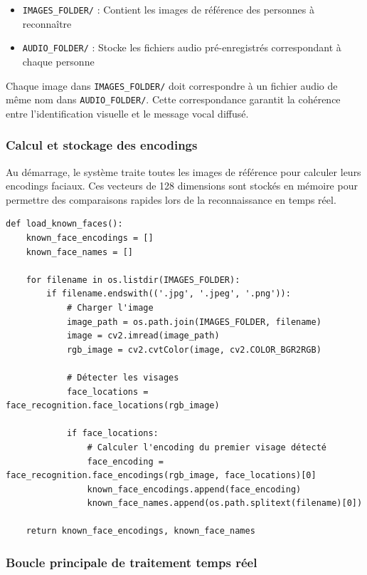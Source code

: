 \documentclass[12pt,a4paper]{article}
\begin{document}
\begin{itemize}
\item \texttt{IMAGES\_FOLDER/} : Contient les images de référence des personnes à reconnaître
\item \texttt{AUDIO\_FOLDER/} : Stocke les fichiers audio pré-enregistrés correspondant à chaque personne
\end{itemize}

Chaque image dans \texttt{IMAGES\_FOLDER/} doit correspondre à un fichier audio de même nom dans \texttt{AUDIO\_FOLDER/}. Cette correspondance garantit la cohérence entre l'identification visuelle et le message vocal diffusé.

\subsubsection{Calcul et stockage des encodings}

Au démarrage, le système traite toutes les images de référence pour calculer leurs encodings faciaux. Ces vecteurs de 128 dimensions sont stockés en mémoire pour permettre des comparaisons rapides lors de la reconnaissance en temps réel.

\begin{lstlisting}[caption=Fonction de calcul des encodings]
def load_known_faces():
    known_face_encodings = []
    known_face_names = []
    
    for filename in os.listdir(IMAGES_FOLDER):
        if filename.endswith(('.jpg', '.jpeg', '.png')):
            # Charger l'image
            image_path = os.path.join(IMAGES_FOLDER, filename)
            image = cv2.imread(image_path)
            rgb_image = cv2.cvtColor(image, cv2.COLOR_BGR2RGB)
            
            # Détecter les visages
            face_locations = face_recognition.face_locations(rgb_image)
            
            if face_locations:
                # Calculer l'encoding du premier visage détecté
                face_encoding = face_recognition.face_encodings(rgb_image, face_locations)[0]
                known_face_encodings.append(face_encoding)
                known_face_names.append(os.path.splitext(filename)[0])
    
    return known_face_encodings, known_face_names
\end{lstlisting}

\subsubsection{Boucle principale de traitement temps réel}
\end{document}
